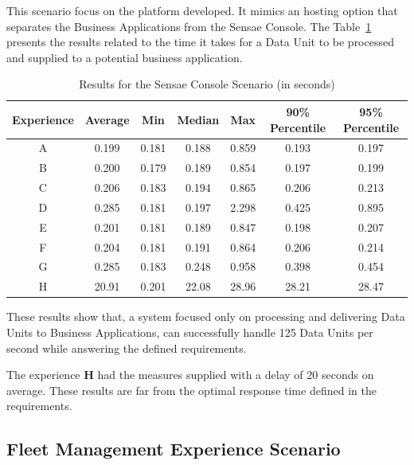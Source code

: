 This scenario focus on the platform developed. It mimics an hosting option that separates the Business Applications from the Sensae Console. The Table~\ref{tab:evaluation:experiences:platform:results} presents the results related to the time it takes for a Data Unit to be processed and supplied to a potential business application.

\begin{table}[H]
    \caption{Results for the Sensae Console Scenario (in seconds)}
    \label{tab:evaluation:experiences:platform:results}
    \centering
    \begin{tabular}{@{}ccccccc@{}}
    \toprule
    \textbf{Experience} & \textbf{Average} & \textbf{Min} & \textbf{Median} & \textbf{Max} & \textbf{90\% Percentile} & \textbf{95\% Percentile} \\ \midrule
    A & 0.199 & 0.181 & 0.188 & 0.859 & 0.193 & 0.197 \\ \midrule
    B & 0.200 & 0.179 & 0.189 & 0.854 & 0.197 & 0.199 \\ \midrule
    C & 0.206 & 0.183 & 0.194 & 0.865 & 0.206 & 0.213 \\ \midrule
    D & 0.285 & 0.181 & 0.197 & 2.298 & 0.425 & 0.895 \\ \midrule
    E & 0.201 & 0.181 & 0.189 & 0.847 & 0.198 & 0.207 \\ \midrule
    F & 0.204 & 0.181 & 0.191 & 0.864 & 0.206 & 0.214 \\ \midrule
    G & 0.285 & 0.183 & 0.248 & 0.958 & 0.398 & 0.454 \\ \midrule
    H & 20.91 & 0.201 & 22.08 & 28.96 & 28.21 & 28.47 \\ \bottomrule
    \end{tabular}
\end{table}

These results show that, a system focused only on processing and delivering Data Units to Business Applications, can successfully handle 125 Data Units per second while answering the defined requirements.

The experience \textbf{H} had the measures supplied with a delay of 20 seconds on average. These results are far from the optimal response time defined in the requirements.

\subsection{Fleet Management Experience Scenario}
\label{subsec:evaluation:experiences:fleet}

